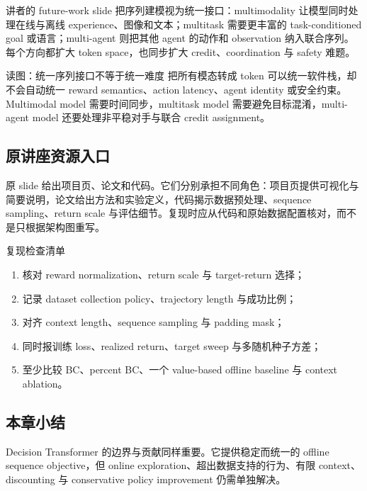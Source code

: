 讲者的 future-work slide 把序列建模视为统一接口：multimodality 让模型同时处理在线与离线 experience、图像和文本；multitask 需要更丰富的 task-conditioned goal 或语言；multi-agent 则把其他 agent 的动作和 observation 纳入联合序列。每个方向都扩大 token space，也同步扩大 credit、coordination 与 safety 难题。


\begin{knowledgebox}{读图：统一序列接口不等于统一难度}
把所有模态转成 token 可以统一软件栈，却不会自动统一 reward semantics、action latency、agent identity 或安全约束。Multimodal model 需要时间同步，multitask model 需要避免目标混淆，multi-agent model 还要处理非平稳对手与联合 credit assignment。
\end{knowledgebox}

\subsection{原讲座资源入口}

原 slide 给出项目页、论文和代码。它们分别承担不同角色：项目页提供可视化与简要说明，论文给出方法和实验定义，代码揭示数据预处理、sequence sampling、return scale 与评估细节。复现时应从代码和原始数据配置核对，而不是只根据架构图重写。


\begin{importantbox}{复现检查清单}
\begin{enumerate}
  \item 核对 reward normalization、return scale 与 target-return 选择；
  \item 记录 dataset collection policy、trajectory length 与成功比例；
  \item 对齐 context length、sequence sampling 与 padding mask；
  \item 同时报训练 loss、realized return、target sweep 与多随机种子方差；
  \item 至少比较 BC、percent BC、一个 value-based offline baseline 与 context ablation。
\end{enumerate}
\end{importantbox}

\subsection{本章小结}

Decision Transformer 的边界与贡献同样重要。它提供稳定而统一的 offline sequence objective，但 online exploration、超出数据支持的行为、有限 context、discounting 与 conservative policy improvement 仍需单独解决。

